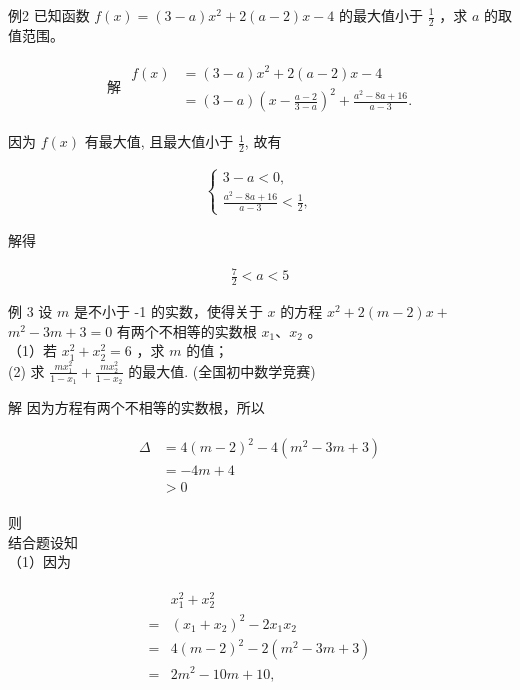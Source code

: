 \documentclass[10pt]{article}
\begin{document}
例2 已知函数 $f(x)=(3-a) x^{2}+2(a-2) x-4$ 的最大值小于 $\frac{1}{2}$ ，求 $a$ 的取值范围。

\begin{align*}
\text { 解 } \begin{aligned}
f(x) & =(3-a) x^{2}+2(a-2) x-4 \\
& =(3-a)\left(x-\frac{a-2}{3-a}\right)^{2}+\frac{a^{2}-8 a+16}{a-3} .
\end{aligned}
\end{align*}

因为 $f(x)$ 有最大值, 且最大值小于 $\frac{1}{2}$, 故有

\begin{align*}
\left\{\begin{array}{l}
3-a<0, \\
\frac{a^{2}-8 a+16}{a-3}<\frac{1}{2},
\end{array}\right.
\end{align*}

解得

\begin{align*}
\frac{7}{2}<a<5
\end{align*}

例 3 设 $m$ 是不小于 -1 的实数，使得关于 $x$ 的方程 $x^{2}+2(m-2) x+$ $m^{2}-3 m+3=0$ 有两个不相等的实数根 $x_{1} 、 x_{2}$ 。\\
（1）若 $x_{1}^{2}+x_{2}^{2}=6$ ，求 $m$ 的值；\\
(2) 求 $\frac{m x_{1}^{2}}{1-x_{1}}+\frac{m x_{2}^{2}}{1-x_{2}}$ 的最大值. (全国初中数学竞赛)

解 因为方程有两个不相等的实数根，所以

\begin{align*}
\begin{aligned}
\Delta & =4(m-2)^{2}-4\left(m^{2}-3 m+3\right) \\
& =-4 m+4 \\
& >0
\end{aligned}
\end{align*}

则\\
结合题设知\\
（1）因为

\begin{align*}
\begin{aligned}
& x_{1}^{2}+x_{2}^{2} \\
= & \left(x_{1}+x_{2}\right)^{2}-2 x_{1} x_{2} \\
= & 4(m-2)^{2}-2\left(m^{2}-3 m+3\right) \\
= & 2 m^{2}-10 m+10,
\end{aligned}
\end{align*}
\end{document}
